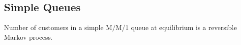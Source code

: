 \documentclass[a4paper,10pt,english]{article}
\begin{document}


\subsection{Simple Queues}
\begin{cor} 
Number of customers in a simple M/M/1 queue at equilibrium is a reversible Markov process.
\end{cor}
\end{document}
